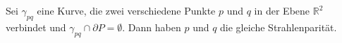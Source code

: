 \begin{lemma}
%
    Sei $\gamma_{pq}$ eine Kurve, die zwei verschiedene Punkte $p$ und $q$ in der Ebene $\mathbb{R}^2$ verbindet und $\gamma_{pq} \cap \partial P = \emptyset$.  
    Dann haben $p$ und $q$ die gleiche Strahlenparität.
\end{lemma}
